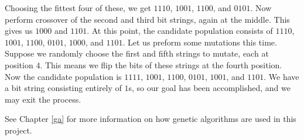 Choosing the fittest four of these, we get $1110$, $1001$, $1100$, and $0101$.
Now perform crossover of the second and third bit strings, again at the middle.
This gives us $1000$ and $1101$.
At this point, the candidate population consists of $1110$, $1001$, $1100$, $0101$, $1000$, and $1101$.
Let us preform some mutations this time.
Suppose we randomly choose the first and fifth strings to mutate, each at position $4$.
This means we flip the bits of these strings at the fourth position.
Now the candidate population is $1111$, $1001$, $1100$, $0101$, $1001$, and $1101$.
We have a bit string consisting entirely of $1$s, so our goal has been accomplished, and we may exit the process.

See Chapter \ref{ga} for more information on how genetic algorithms are used in this project.
